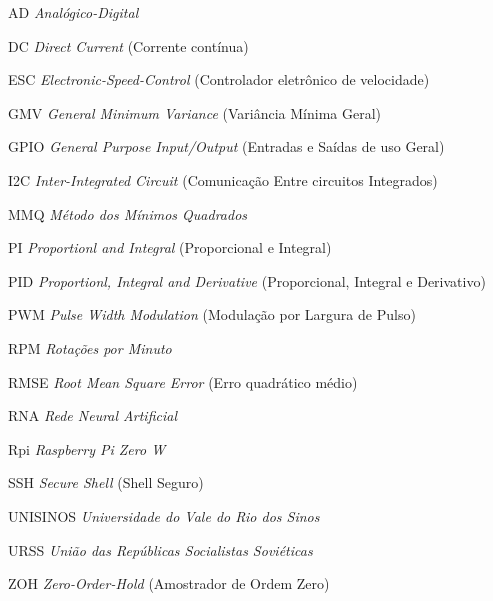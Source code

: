\listoffigures*
\cleardoublepage
\begin{KeepFromToc}
\lstlistoflistings
\end{KeepFromToc}
\cleardoublepage
\listoftables*
\cleardoublepage
\begin{siglas}
\item[AD] \textit{Analógico-Digital}
\item[DC]  \textit{Direct Current} (Corrente contínua)
\item[ESC]  \textit{Electronic-Speed-Control} (Controlador eletrônico de velocidade)
\item[GMV]  \textit{General Minimum Variance} (Variância Mínima Geral)
\item[GPIO]  \textit{General Purpose Input/Output} (Entradas e Saídas de uso Geral)
\item[I2C]  \textit{Inter-Integrated Circuit} (Comunicação Entre circuitos Integrados)
\item[MMQ]  \textit{Método dos Mínimos Quadrados}
\item[PI] \textit{Proportionl and Integral} (Proporcional e Integral)
\item[PID] \textit{Proportionl, Integral and Derivative} (Proporcional, Integral e Derivativo)
\item[PWM]  \textit{Pulse Width Modulation} (Modulação por Largura de Pulso)
\item[RPM]  \textit{Rotações por Minuto}
\item[RMSE]  \textit{Root Mean Square Error} (Erro quadrático médio)
\item[RNA]  \textit{Rede Neural Artificial}
\item[Rpi]  \textit{Raspberry Pi Zero W}
\item[SSH]  \textit{Secure Shell} (Shell Seguro)
\item[UNISINOS]  \textit{Universidade do Vale do Rio dos Sinos}
\item[URSS]  \textit{União das Repúblicas Socialistas Soviéticas}
\item[ZOH]  \textit{Zero-Order-Hold} (Amostrador de Ordem Zero)

\end{siglas}

